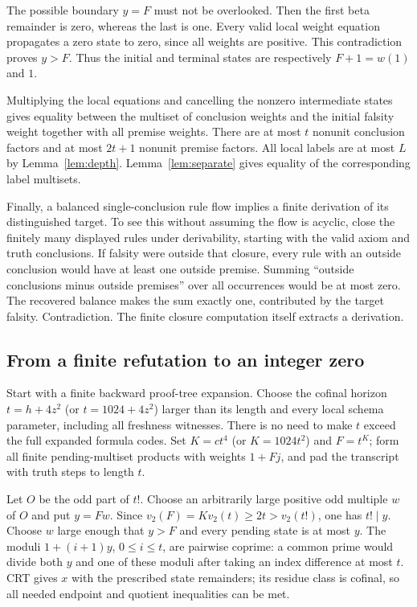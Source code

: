 The possible boundary $y=F$ must not be overlooked. Then the first beta
remainder is zero, whereas the last is one. Every valid local weight
equation propagates a zero state to zero, since all weights are positive.
This contradiction proves $y>F$. Thus the initial and terminal states
are respectively $F+1=w(1)$ and $1$.

Multiplying the local equations and cancelling the nonzero intermediate
states gives equality between the multiset of conclusion weights and
the initial falsity weight together with all premise weights. There are
at most $t$ nonunit conclusion factors and at most $2t+1$ nonunit premise
factors. All local labels are at most $L$ by Lemma~\ref{lem:depth}.
Lemma~\ref{lem:separate} gives equality of the corresponding label
multisets.

Finally, a balanced single-conclusion rule flow implies a finite
derivation of its distinguished target. To see this without assuming the
flow is acyclic, close the finitely many displayed rules under derivability,
starting with the valid axiom and truth conclusions. If falsity were outside
that closure, every rule with an outside conclusion would have at least one
outside premise. Summing ``outside conclusions minus outside premises''
over all occurrences would be at most zero. The recovered balance makes
the sum exactly one, contributed by the target falsity. Contradiction.
The finite closure computation itself extracts a derivation.

\subsection{From a finite refutation to an integer zero}

Start with a finite backward proof-tree expansion. Choose the cofinal
horizon $t=h+4z^2$ (or $t=1024+4z^2$) larger than its length and every local schema
parameter, including all freshness witnesses. There is no need to make
$t$ exceed the full expanded formula codes. Set $K=ct^4$ (or $K=1024t^2$) and $F=t^K$;
form all finite pending-multiset products with weights $1+Fj$, and pad
the transcript with truth steps to length $t$.

Let $O$ be the odd part of $t!$. Choose an arbitrarily large positive odd
multiple $w$ of $O$ and put $y=Fw$. Since
$v_2(F)=K v_2(t)\ge2t>v_2(t!)$, one has $t!\mid y$.
Choose $w$ large enough that $y>F$ and every pending state is at most $y$.
The moduli $1+(i+1)y$, $0\le i\le t$, are pairwise coprime: a
common prime would divide both $y$ and one of these moduli after taking
an index difference at most $t$. CRT gives $x$ with the prescribed state
remainders; its residue class is cofinal, so all needed endpoint and
quotient inequalities can be met.

